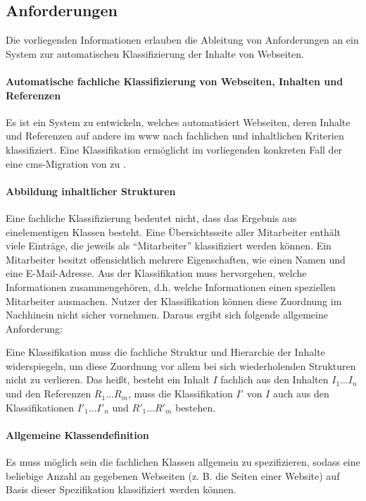     \subsection{Anforderungen}
        \label{section:requirements}
        Die vorliegenden Informationen erlauben
        die Ableitung von Anforderungen an ein System
        zur automatischen Klassifizierung der Inhalte von Webseiten.

        \paragraph*{Automatische fachliche Klassifizierung von Webseiten, Inhalten und Referenzen}
        Es ist ein System zu entwickeln, welches automatisiert Webseiten,
        deren Inhalte und Referenzen auf andere {\resources} im \gls{www}
        nach fachlichen und inhaltlichen Kriterien klassifiziert.
        Eine Klassifikation ermöglicht im vorliegenden konkreten Fall
        der {\fernUni} eine \gls{cms}-Migration von {\wordpress} zu {\imperia}.

        \paragraph*{Abbildung inhaltlicher Strukturen}
        Eine fachliche Klassifizierung bedeutet nicht,
        dass das Ergebnis aus einelementigen Klassen besteht.
        Eine Übersichtsseite aller Mitarbeiter enthält viele Einträge,
        die jeweils als "`Mitarbeiter"' klassifiziert werden können.
        Ein Mitarbeiter besitzt offensichtlich mehrere Eigenschaften,
        wie einen Namen und eine E-Mail-Adresse.
        Aus der Klassifikation muss hervorgehen,
        welche Informationen zusammengehören,
        d.h. welche Informationen einen speziellen Mitarbeiter ausmachen.
        Nutzer der Klassifikation können diese Zuordnung im Nachhinein nicht sicher vornehmen.
        Daraus ergibt sich folgende allgemeine Anforderung:

        Eine Klassifikation muss die fachliche Struktur
        und Hierarchie der Inhalte widerspiegeln,
        um diese Zuordnung vor allem bei sich wiederholenden Strukturen
        nicht zu verlieren.
        Das heißt, besteht ein Inhalt $I$ fachlich aus den Inhalten $I_1 \ldots I_n$
        und den Referenzen $R_1 \ldots R_m$,
        muss die Klassifikation $I'$ von $I$ auch aus den Klassifikationen
        $I'_1 \ldots I'_n$ und $R'_1 \ldots R'_m$ bestehen.

        \paragraph*{Allgemeine Klassendefinition}
        Es muss möglich sein die fachlichen Klassen allgemein zu
        spezifizieren, sodass eine beliebige Anzahl an gegebenen
        Webseiten (z. B. die Seiten einer Website)
        auf Basis dieser Spezifikation klassifiziert werden können.

